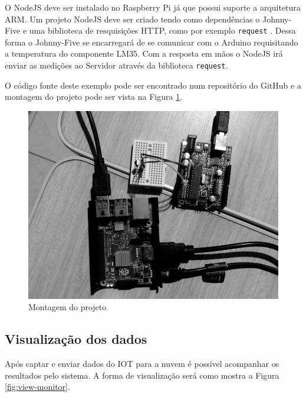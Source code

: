 O NodeJS deve ser instalado no Raspberry Pi já que possui suporte a
arquitetura ARM. Um projeto NodeJS deve ser criado tendo como
dependências o Johnny-Five e uma biblioteca de resquisições HTTP, como
por exemplo \texttt{request} \cite{request:2016}. Dessa forma o
Johnny-Five se encarregará de se comunicar com o Arduino requisitando a
temperatura do componente LM35. Com a resposta em mãos o NodeJS irá
enviar as medições ao Servidor através da biblioteca \texttt{request}.

O código fonte deste exemplo pode ser encontrado num repositório do
GitHub \cite{alves:2016} e a montagem do projeto pode ser vista na
Figura \ref{fig:montagem}.

\begin{figure}[h]
    \centering
    \includegraphics[scale=0.4]{img/montagem-grey.jpg}
    \caption{Montagem do projeto} \label{fig:montagem}
\end{figure}

\subsection{Visualização dos dados}\label{visualizauxe7uxe3o-dos-dados}

Após captar e enviar dados do IOT para a nuvem é possível acompanhar os
resultados pelo sistema. A forma de visualização será como mostra a
Figura \ref{fig:view-monitor}.

